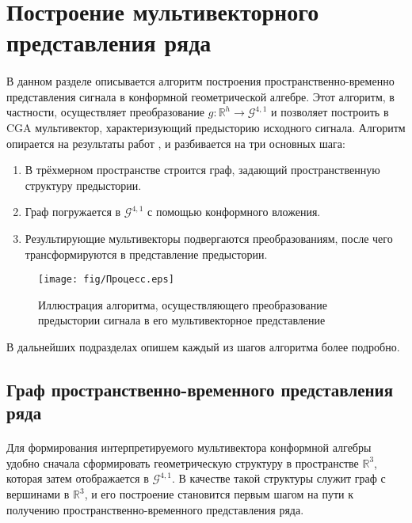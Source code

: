 \documentclass[12pt]{article}
\begin{document}
\newpage
\section{Построение мультивекторного представления ряда}

\paragraph{}
В данном разделе описывается алгоритм построения пространственно-временно представления сигнала в конформной геометрической алгебре. Этот алгоритм, в частности, осуществляет преобразование $g:\mathds{R}^h \rightarrow \mathcal{G}^{4,1}$ и позволяет построить в CGA мультивектор, характеризующий предысторию исходного сигнала. Алгоритм опирается на результаты работ \cite{Thiruvengadam2020}, \cite{Yuan2010} и  разбивается на три основных шага: 
\begin{enumerate}
    \item В трёхмерном пространстве строится граф, задающий пространственную структуру предыстории.
    \item Граф погружается в $\mathcal{G}^{4,1}$ с помощью конформного вложения.
    \item Результирующие мультивекторы подвергаются преобразованиям, после чего трансформируются в представление предыстории.
\end{enumerate}


\vspace{1.5cm}
\begin{figure}[h]
    \centering
    \texttt{[image: fig/Процесс.eps]}
    \caption{Иллюстрация алгоритма, осуществляющего преобразование предыстории сигнала в его мультивекторное представление}
\end{figure}

\vspace{1.5cm}
\noindent
В дальнейших подразделах опишем каждый из шагов алгоритма более подробно.

\newpage
\subsection{Граф пространственно-временного представления ряда}
\paragraph{}
Для формирования интерпретируемого мультивектора конформной алгебры удобно сначала сформировать геометрическую структуру в пространстве $\mathds{R}^3$, которая затем отображается в $\mathcal{G}^{4,1}$. В качестве такой структуры служит граф с вершинами в $\mathds{R}^3$, и его построение становится первым шагом на пути к получению пространственно-временного представления ряда.
\end{document}

